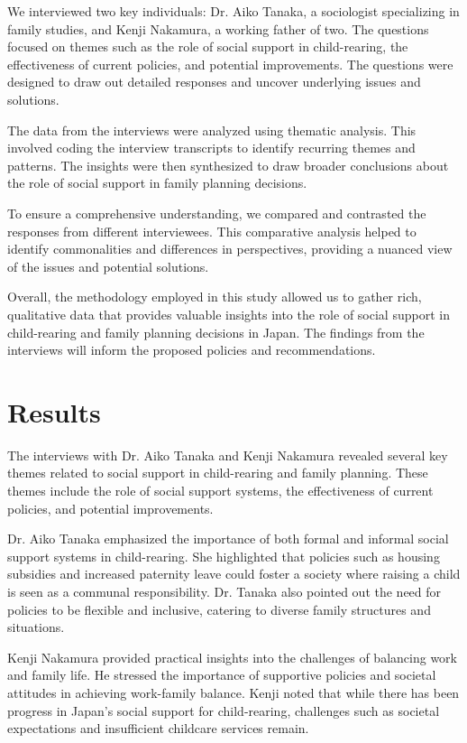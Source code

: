 \documentclass{article} %
\begin{document}
We interviewed two key individuals: Dr. Aiko Tanaka, a sociologist specializing in family studies, and Kenji Nakamura, a working father of two. The questions focused on themes such as the role of social support in child-rearing, the effectiveness of current policies, and potential improvements. The questions were designed to draw out detailed responses and uncover underlying issues and solutions.

The data from the interviews were analyzed using thematic analysis. This involved coding the interview transcripts to identify recurring themes and patterns. The insights were then synthesized to draw broader conclusions about the role of social support in family planning decisions.

To ensure a comprehensive understanding, we compared and contrasted the responses from different interviewees. This comparative analysis helped to identify commonalities and differences in perspectives, providing a nuanced view of the issues and potential solutions.

Overall, the methodology employed in this study allowed us to gather rich, qualitative data that provides valuable insights into the role of social support in child-rearing and family planning decisions in Japan. The findings from the interviews will inform the proposed policies and recommendations.


\section{Results}
\label{sec:results}

The interviews with Dr. Aiko Tanaka and Kenji Nakamura revealed several key themes related to social support in child-rearing and family planning. These themes include the role of social support systems, the effectiveness of current policies, and potential improvements.

Dr. Aiko Tanaka emphasized the importance of both formal and informal social support systems in child-rearing. She highlighted that policies such as housing subsidies and increased paternity leave could foster a society where raising a child is seen as a communal responsibility. Dr. Tanaka also pointed out the need for policies to be flexible and inclusive, catering to diverse family structures and situations.

Kenji Nakamura provided practical insights into the challenges of balancing work and family life. He stressed the importance of supportive policies and societal attitudes in achieving work-family balance. Kenji noted that while there has been progress in Japan's social support for child-rearing, challenges such as societal expectations and insufficient childcare services remain.
\end{document}
